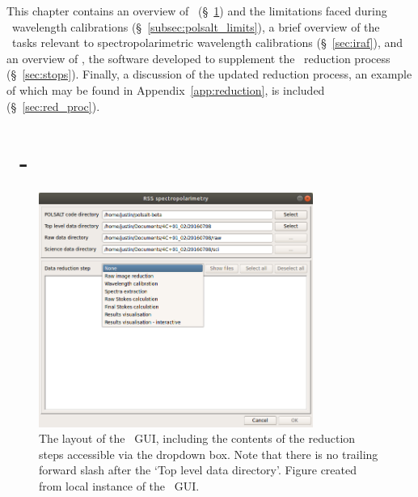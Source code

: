 
This chapter contains an overview of \polsalt\ (\S~\ref{sec:polsalt}) and the limitations faced during \polsalt\ wavelength calibrations (\S~\ref{subsec:polsalt_limits}), a brief overview of the \iraf\ tasks relevant to spectropolarimetric wavelength calibrations (\S~\ref{sec:iraf}), and an overview of \stops, the software developed to supplement the \polsalt\ reduction process (\S~\ref{sec:stops}). Finally, a discussion of the updated reduction process, an example of which may be found in Appendix~\ref{app:reduction}, is included (\S~\ref{sec:red_proc}).

\section[\polsalt]{\polsalt\ - } \label{sec:polsalt}

\begin{figure}[t]
    \centering
    \includegraphics[width = 0.8\textwidth]{figures/3_polsalt_GUI.png}
    \caption{The layout of the \polsalt\ \gls{GUI}, including the contents of the reduction steps accessible via the dropdown box. Note that there is no trailing forward slash after the `Top level data directory'. Figure created from local instance of the \polsalt\ \gls{GUI}.}
    \label{fig:polsalt_gui}
\end{figure}

